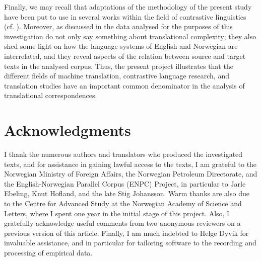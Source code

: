 \documentclass[output=paper]{LSP/langsci}
\begin{document}
Finally, we may recall that adaptations of the methodology of the present study have been put to use in several works within the field of contrastive linguistics (cf. ). Moreover, as discussed in \citet[446--447]{Thunes2011} the data analysed for the purposes of this investigation do not only say something about translational complexity; they also shed some light on how the language systems of English and Norwegian are interrelated, and they reveal aspects of the relation between source and target texts in the analysed corpus. Thus, the present project illustrates that the different fields of machine translation, contrastive language research, and translation studies have an important common denominator in the analysis of translational correspondences.

\section{Acknowledgments}\label{sec:thunes:6}

I thank the numerous authors and translators who produced the investigated texts, and for assistance in gaining lawful access to the texts, I am grateful to the Norwegian Ministry of Foreign Affairs, the Norwegian Petroleum Directorate, and the English-Norwegian Parallel Corpus (ENPC) Project, in particular to Jarle Ebeling, Knut Hofland, and the late Stig Johansson. Warm thanks are also due to the Centre for Advanced Study at the Norwegian Academy of Science and Letters, where I spent one year in the initial stage of this project. Also, I gratefully acknowledge useful comments from two anonymous reviewers on a previous version of this article. Finally, I am much indebted to Helge Dyvik for invaluable assistance, and in particular for tailoring software to the recording and processing of empirical data.
\sloppy
\printbibliography[heading=subbibliography,notkeyword=this]
\end{document}
